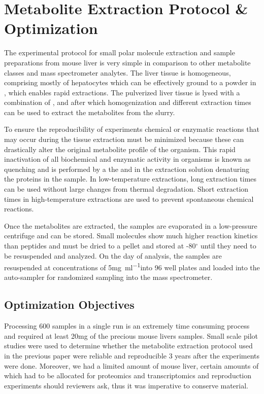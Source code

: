 \documentclass[a4paper,11pt,twoside]{book}
\begin{document}
	
	\section{Metabolite Extraction Protocol \& Optimization}
	
	The experimental protocol for small polar molecule extraction and sample preparations from mouse liver is very simple in comparison to other metabolite classes and mass spectrometer analytes\citep{Mushtaq2014ExtractionMetabolome,Haynes2009Sphingolipidomics:Sphingolipids,Hu2009AnalyticalDiscovery}. The liver tissue is homogeneous, comprising mostly of hepatocytes which can be effectively ground to a powder in , which enables rapid extractions. The pulverized liver tissue is lysed with a combination of ,  and  after which homogenization and different extraction times can be used to extract the metabolites from the slurry. 
	
    To ensure the reproducibility of experiments chemical or enzymatic reactions that may occur during the tissue extraction must be minimized because these can drastically alter the original metabolite profile of the organism\citep{Mushtaq2014ExtractionMetabolome}. This rapid inactivation of all biochemical and enzymatic activity in organisms is known as quenching and is performed by a the  and  in the extraction solution denaturing the proteins in the sample. In low-temperature extractions, long extraction times can be used without large changes from thermal degradation. Short extraction times in high-temperature extractions are used to prevent spontaneous chemical reactions. 
	
    Once the metabolites are extracted, the samples are evaporated in a low-pressure centrifuge and can be stored. Small molecules show much higher reaction kinetics than peptides and must be dried to a pellet and stored at -80$^{\circ}$ until they need to be resuspended and analyzed. On the day of analysis, the samples are resuspended at concentrations of 5\si{\milli\gram\per\milli\litre}into 96 well plates and loaded into the auto-sampler for randomized sampling into the mass spectrometer.
	
	\subsection{Optimization Objectives}
	
	Processing 600 samples in a single run is an extremely time consuming process and required at least 20\si{\milli\gram} of the precious mouse livers samples. Small scale pilot studies were used to determine whether the metabolite extraction protocol used in the previous paper\citep{Williams2016SystemsFunction} were reliable and reproducible 3 years after the experiments were done. Moreover, we had a limited amount of mouse liver, certain amounts of which had to be allocated for proteomics and transcriptomics and reproduction experiments should reviewers ask, thus it was imperative to conserve material. 
	
\end{document}
